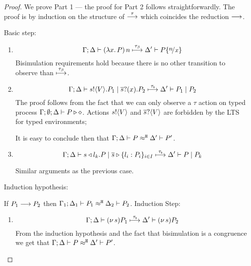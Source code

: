 \begin{proof}
	\noi 
	We prove Part 1 --- the proof for Part 2 follows straightforwardly.
	The proof is by induction on the structure of $\stackrel{\tau}{\longrightarrow}$
	which coincides the reduction $\longrightarrow$.

	\noi Basic step:
	\begin{enumerate}
		\item %
		\[
			\horel{\Gamma}{\Delta}{\appl{(\abs{x}{P})}{n}}{\hby{\btau}}{\Delta'}{P \subst{n}{x}}
		\]
		\noi Bisimulation requirements hold because there is no other transition to observe than ${\stackrel{\tau_{\beta}}{\longmapsto}}$.

		\item %
		\[
			\Gamma; \Delta \vdash s ! \langle V \rangle . P_1 \;|\; \overline{s} ? (x) . P_2 \stackrel{\tau_{\mathsf{s}}}{\longmapsto} \Delta' \vdash P_1 \;|\; P_2
		\]
		\noi The proof follows from the fact that we can only observe a $\tau$
		action on typed process
		$\Gamma; \emptyset; \Delta \vdash P \triangleright \diamond$.
		Actions $s ! \langle V \rangle$ and $\overline{s} ? \langle V \rangle$
		are forbidden by the LTS for typed environments;

		\noi It is easy to conclude then that $\Gamma; \Delta \vdash P \approx^\mathtt{H} \Delta' \vdash P'$.

		\item %
			\[
				\Gamma; \Delta \vdash s \triangleleft l_k . P \;|\; \overline{s} \triangleright \{l_i: P_i\}_{i \in I} \stackrel{\tau_{\mathsf{s}}}{\longmapsto} \Delta' \vdash P \;|\; P_k
			\]

		\noi Similar arguments as the previous case.
	\end{enumerate}
	
	\noi Induction hypothesis:

	\noi If $P_1 \longrightarrow P_2$ then $\Gamma_1; \Delta_1 \vdash P_1 \approx^\mathtt{H} \Delta_2 \vdash P_2$.
	\noi Induction Step:
	\begin{enumerate}
		\item %
		\[
			\Gamma; \Delta \vdash (\nu\, s){P_1} \stackrel{\tau_{\mathsf{s}}}{\longmapsto} \Delta' \vdash (\nu\, s) P_2
		\]
		\noi From the induction hypothesis and the fact that bisimulation is a congruence
		we get that $\Gamma; \Delta \vdash P \approx^\mathtt{H} \Delta' \vdash P'$.


\end{enumerate}
\end{proof}
